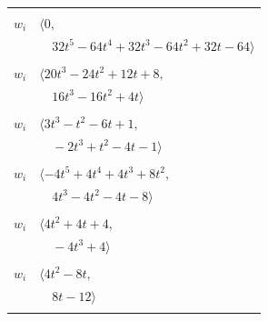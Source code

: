 \documentclass[11pt]{article}
\begin{document}
\begin{longtable}{@{}ll@{}}
\addlinespace[2pt]
\multicolumn{2}{@{}p{0.97\textwidth}@{}}{$i=43$, $D_i=32$, $\rho_{ij}$: $11{:}1, \allowbreak 13{:}1, \allowbreak 14{:}1, \allowbreak 47{:}2, \allowbreak 49{:}2, \allowbreak 54{:}1, \allowbreak 56{:}1, \allowbreak 62{:}2$}\\
$w_i$ & $\langle 0,$\\
 & $\quad 32t^{5}-64t^{4}+32t^{3}-64t^{2}+32t-64\rangle$\\
\addlinespace[2pt]
\multicolumn{2}{@{}p{0.97\textwidth}@{}}{$i=44$, $D_i=4$, $\rho_{ij}$: $3{:}1, \allowbreak 13{:}2, \allowbreak 16{:}1, \allowbreak 18{:}2, \allowbreak 24{:}2, \allowbreak 36{:}2, \allowbreak 37{:}1, \allowbreak 50{:}1, \allowbreak 55{:}2, \allowbreak 57{:}1$}\\
$w_i$ & $\langle 20t^{3}-24t^{2}+12t+8,$\\
 & $\quad 16t^{3}-16t^{2}+4t\rangle$\\
\addlinespace[2pt]
\multicolumn{2}{@{}p{0.97\textwidth}@{}}{$i=45$, $D_i=2$, $\rho_{ij}$: $14{:}1, \allowbreak 15{:}2, \allowbreak 17{:}2, \allowbreak 24{:}2, \allowbreak 42{:}2, \allowbreak 54{:}1$}\\
$w_i$ & $\langle 3t^{3}-t^{2}-6t+1,$\\
 & $\quad -2t^{3}+t^{2}-4t-1\rangle$\\
\addlinespace[2pt]
\multicolumn{2}{@{}p{0.97\textwidth}@{}}{$i=46$, $D_i=4$, $\rho_{ij}$: $3{:}2, \allowbreak 13{:}1, \allowbreak 31{:}1, \allowbreak 33{:}2, \allowbreak 49{:}2, \allowbreak 54{:}2$}\\
$w_i$ & $\langle -4t^{5}+4t^{4}+4t^{3}+8t^{2},$\\
 & $\quad 4t^{3}-4t^{2}-4t-8\rangle$\\
\addlinespace[2pt]
\multicolumn{2}{@{}p{0.97\textwidth}@{}}{$i=47$, $D_i=2$, $\rho_{ij}$: $14{:}1, \allowbreak 30{:}2, \allowbreak 43{:}1, \allowbreak 51{:}1, \allowbreak 56{:}1, \allowbreak 58{:}2$}\\
$w_i$ & $\langle 4t^{2}+4t+4,$\\
 & $\quad -4t^{3}+4\rangle$\\
\addlinespace[2pt]
\multicolumn{2}{@{}p{0.97\textwidth}@{}}{$i=48$, $D_i=4$, $\rho_{ij}$: $8{:}2, \allowbreak 20{:}2, \allowbreak 30{:}2, \allowbreak 42{:}2, \allowbreak 56{:}2$}\\
$w_i$ & $\langle 4t^{2}-8t,$\\
 & $\quad 8t-12\rangle$\\
\addlinespace[2pt]
\multicolumn{2}{@{}p{0.97\textwidth}@{}}{$i=49$, $D_i=4$, $\rho_{ij}$: $11{:}2, \allowbreak 12{:}1, \allowbreak 14{:}2, \allowbreak 24{:}2, \allowbreak 25{:}2, \allowbreak 43{:}1, \allowbreak 46{:}1, \allowbreak 50{:}2$}\\

\end{longtable}
\end{document}
